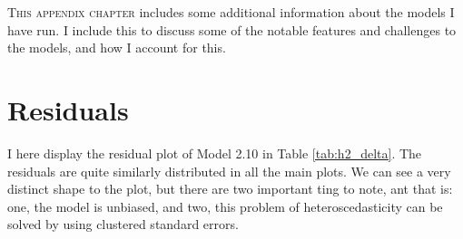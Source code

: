 \lettrine{T}{his appendix chapter} includes some additional information about the models I have run. I include this to discuss some of the notable features and challenges to the models, and how I account for this.

\section{Residuals}
I here display the residual plot of Model 2.10 in Table \ref{tab:h2_delta}. The residuals are quite similarly distributed in all the main plots. We can see a very distinct shape to the plot, but there are two important ting to note, ant that is: one, the model is unbiased, and two, this problem of heteroscedasticity can be solved by using clustered standard errors.